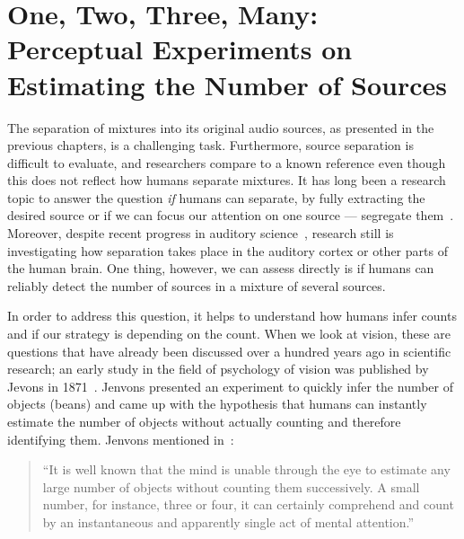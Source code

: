 \chapter[Experiments on Estimating the Number of Sources]{One, Two, Three, Many: Perceptual Experiments on Estimating the Number of Sources}
\label{cha:countanalysis}
\bigskip
\bigskip
\bigskip
\bigskip
%
The separation of mixtures into its original audio sources, as presented in the previous chapters, is a challenging task.
Furthermore, source separation is difficult to evaluate, and researchers compare to a known reference even though this does not reflect how humans separate mixtures.
It has long been a research topic to answer the question \emph{if} humans can separate, by fully extracting the desired source or if we can focus our attention on one source --- segregate them~\cite{bregman90}.
Moreover, despite recent progress in auditory science~\cite{carlyon04, koelsch05, rabinowitz13}, research still is investigating how separation takes place in the auditory cortex or other parts of the human brain.
One thing, however, we can assess directly is if humans can reliably detect the number of sources in a mixture of several sources.
\par
In order to address this question, it helps to understand how humans infer counts and if our strategy is depending on the count.
When we look at vision, these are questions that have already been discussed over a hundred years ago in scientific research; an early study in the field of psychology of vision was published by Jevons in 1871~\cite{jevons1871}.
Jenvons presented an experiment to quickly infer the number of objects (beans) and came up with the hypothesis that humans can instantly estimate the number of objects without actually counting and therefore identifying them.
Jenvons mentioned in~\cite{jevons1871}:

\begin{quote}
``It is well known that the mind is unable through the eye to estimate any large number of objects without counting them successively. A small number, for instance, three or four, it can certainly comprehend and count by an instantaneous and apparently single act of mental attention.''
\end{quote}

